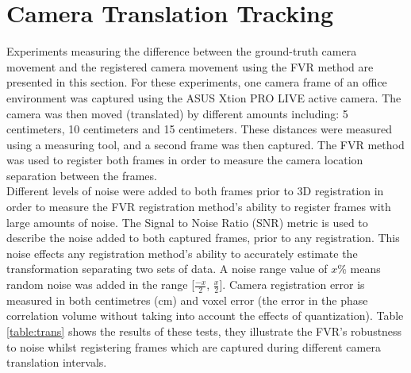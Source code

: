 \section{Camera Translation Tracking}
\label{Sec:CamTransTrackExp}

Experiments measuring the difference between the ground-truth camera movement and the registered camera movement using the FVR method are presented in this section. For these experiments, one camera frame of an office environment was captured using the ASUS Xtion PRO LIVE active camera. The camera was then moved (translated) by different amounts including: 5 centimeters, 10 centimeters and 15 centimeters. These distances were measured using a measuring tool, and a second frame was then captured. The FVR method was used to register both frames in order to measure the camera location separation between the frames. \\

Different levels of noise were added to both frames prior to 3D registration in order to measure the FVR registration method's ability to register frames with large amounts of noise. The Signal to Noise Ratio (SNR) metric is used to describe the noise added to both captured frames, prior to any registration. This noise effects any registration method's ability to accurately estimate the transformation separating two sets of data. A noise range value of $x$\% means random noise was added in the range [$\frac{-x}{2}$, $\frac{x}{2}$]. Camera registration error is measured in both centimetres (cm) and voxel error (the error in the phase correlation volume without taking into account the effects of quantization). Table \ref{table:trans} shows the results of these tests, they illustrate the FVR's robustness to noise whilst registering frames which are captured during different camera translation intervals. \\



